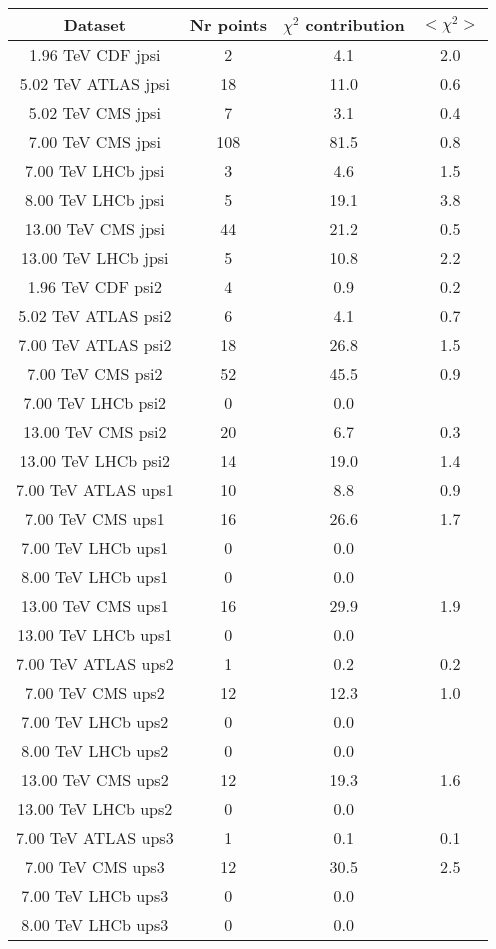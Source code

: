 \begin{table}[h!]
\centering
\begin{tabular}{c|c|c|c}
Dataset & Nr points & $\chi^2$ contribution & $<\chi^2>$ \\
\hline
1.96 TeV CDF jpsi & 2 & 4.1 & 2.0 \\
5.02 TeV ATLAS jpsi & 18 & 11.0 & 0.6 \\
5.02 TeV CMS jpsi & 7 & 3.1 & 0.4 \\
7.00 TeV CMS jpsi & 108 & 81.5 & 0.8 \\
7.00 TeV LHCb jpsi & 3 & 4.6 & 1.5 \\
8.00 TeV LHCb jpsi & 5 & 19.1 & 3.8 \\
13.00 TeV CMS jpsi & 44 & 21.2 & 0.5 \\
13.00 TeV LHCb jpsi & 5 & 10.8 & 2.2 \\
1.96 TeV CDF psi2 & 4 & 0.9 & 0.2 \\
5.02 TeV ATLAS psi2 & 6 & 4.1 & 0.7 \\
7.00 TeV ATLAS psi2 & 18 & 26.8 & 1.5 \\
7.00 TeV CMS psi2 & 52 & 45.5 & 0.9 \\
7.00 TeV LHCb psi2 & 0 & 0.0 &  \\
13.00 TeV CMS psi2 & 20 & 6.7 & 0.3 \\
13.00 TeV LHCb psi2 & 14 & 19.0 & 1.4 \\
7.00 TeV ATLAS ups1 & 10 & 8.8 & 0.9 \\
7.00 TeV CMS ups1 & 16 & 26.6 & 1.7 \\
7.00 TeV LHCb ups1 & 0 & 0.0 &  \\
8.00 TeV LHCb ups1 & 0 & 0.0 &  \\
13.00 TeV CMS ups1 & 16 & 29.9 & 1.9 \\
13.00 TeV LHCb ups1 & 0 & 0.0 &  \\
7.00 TeV ATLAS ups2 & 1 & 0.2 & 0.2 \\
7.00 TeV CMS ups2 & 12 & 12.3 & 1.0 \\
7.00 TeV LHCb ups2 & 0 & 0.0 &  \\
8.00 TeV LHCb ups2 & 0 & 0.0 &  \\
13.00 TeV CMS ups2 & 12 & 19.3 & 1.6 \\
13.00 TeV LHCb ups2 & 0 & 0.0 &  \\
7.00 TeV ATLAS ups3 & 1 & 0.1 & 0.1 \\
7.00 TeV CMS ups3 & 12 & 30.5 & 2.5 \\
7.00 TeV LHCb ups3 & 0 & 0.0 &  \\
8.00 TeV LHCb ups3 & 0 & 0.0 &  \\

\end{tabular}
\end{table}
